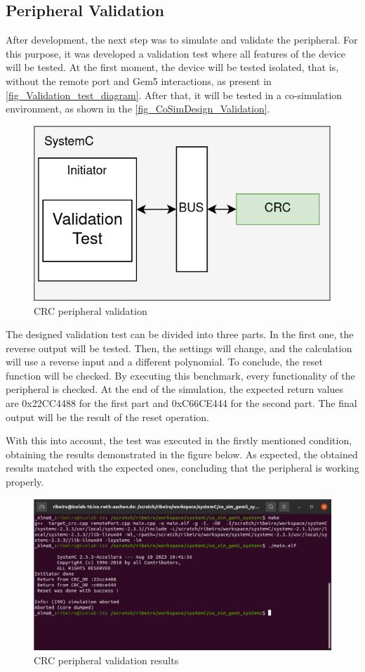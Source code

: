 \subsection{Peripheral Validation}

After development, the next step was to simulate and validate the peripheral. For this purpose, it was developed a validation test where
all features of the device will be tested. At the first moment, the device will be tested isolated, that is, without the remote port and Gem5 
interactions, as present in \autoref{fig_Validation_test_diagram}. After that, it will be tested in a co-simulation environment, as shown in the 
\autoref{fig_CoSimDesign_Validation}. 

\begin{figure}[H]
	\centering
 	\includegraphics[width=0.5\linewidth]{Images/Validation_test_diagram.png} 
 	\caption{CRC peripheral validation}
	\label{fig_Validation_test_diagram}
\end{figure}

The designed validation test can be divided into three parts. In the first one, the reverse output will be tested. Then, the settings will 
change, and the calculation will use a reverse input and a different polynomial. To conclude, the reset function will be checked. 
By executing this benchmark, every functionality of the peripheral is checked. At the end of the simulation, the expected return values are 
0x22CC4488 for the first part and 0xC66CE444 for the second part. The final output will be the result of the reset operation. 

With this into account, the test was executed in the firstly mentioned condition, obtaining the results demonstrated in the figure below. As 
expected, the obtained results matched with the expected ones, concluding that the peripheral is working properly. 

\begin{figure}[H]
	\centering
 	\includegraphics[width=0.9\linewidth]{Images/Validation_SystemC.png} 
 	\caption{CRC peripheral validation results}
\end{figure}

